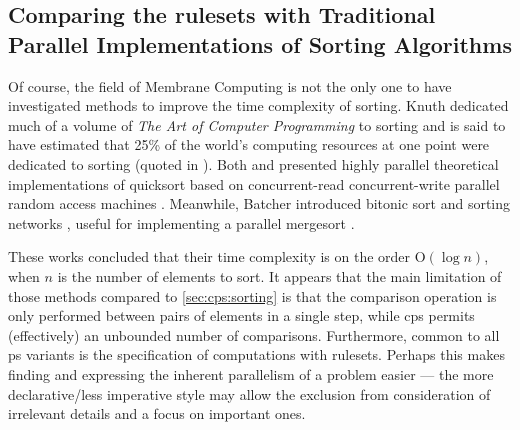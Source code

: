 
\subsection{Comparing the  \Glspl{ruleset} with Traditional Parallel Implementations of Sorting Algorithms}

Of course, the field of Membrane Computing is not the only one to have investigated methods to improve the time complexity of sorting.  Knuth dedicated much of a volume of \textit{The Art of Computer Programming} to sorting \cite{Knuth1998} and is said to have estimated that 25\% of the world's computing resources at one point were dedicated to sorting (quoted in \cite{Powers1991}).  Both \citeauthor{Powers1991} \cite{Powers1991} and \citeauthor{Chlebus1991} \cite{Chlebus1991} presented highly parallel theoretical implementations of quicksort based on concurrent-read concurrent-write parallel random access machines \cite{JaJa2011}.  Meanwhile, Batcher introduced bitonic sort and sorting networks \cite{Akl2011}, useful for implementing a parallel mergesort \cite{Lee1995}.

These works concluded that their time complexity is on the order O\((\log n)\), when \(n\) is the number of elements to sort.  It appears that the main limitation of those methods compared to \cref{sec:cps:sorting} is that the comparison operation is only performed between pairs of elements in a single step, while \gls{cps} permits (effectively) an unbounded number of comparisons.  Furthermore, common to all \gls{ps} variants is the specification of computations with \glspl{ruleset}.  Perhaps this makes finding and expressing the inherent parallelism of a problem easier --- the more declarative/less imperative style may allow the exclusion from consideration of irrelevant details and a focus on important ones.